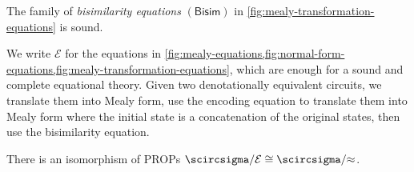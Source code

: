 \documentclass[10pt]{article}
\begin{document}
\begin{lemma}
    The family of \emph{bisimilarity equations} \((\mathsf{Bisim})\) in
    \cref{fig:mealy-transformation-equations} is sound.
\end{lemma}

We write \(\mathcal{E}\) for the equations in
\cref{fig:mealy-equations,fig:normal-form-equations,fig:mealy-transformation-equations},
which are enough for a sound and complete equational theory.
Given two denotationally equivalent circuits, we translate them into Mealy
form, use the encoding equation to translate them into Mealy form where the
initial state is a concatenation of the original states,
then use the bisimilarity equation.

\begin{theorem}
    There is an isomorphism of PROPs
    \(\scircsigma / \mathcal{E} \cong \scircsigma / {\approx}\).
\end{theorem}
\end{document}
